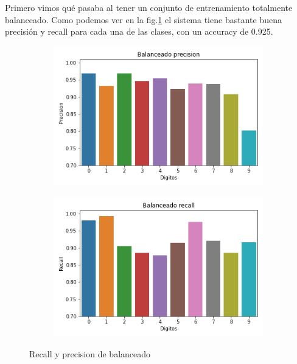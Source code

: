 Primero vimos qué pasaba al tener un conjunto de entrenamiento totalmente balanceado. Como podemos ver en la fig.\ref{fig:bal_recall_prec} el sistema tiene bastante buena precisión y recall para cada una de las clases, con un accuracy de 0.925.
\begin{figure}[h]
    \centering
    \begin{subfigure}{.5\textwidth}
        \centering
        \includegraphics[width=.9\linewidth]{images/balanceo/Balanceado precision_3795.png}
    \end{subfigure}%
    \begin{subfigure}{.5\textwidth}
        \centering
        \includegraphics[width=.9\linewidth]{images/balanceo/Balanceado recall_3795.png}
    \end{subfigure}%
    \caption{Recall y precision de balanceado}
    \label{fig:bal_recall_prec}
\end{figure}

